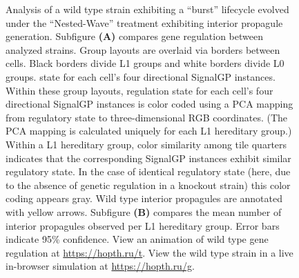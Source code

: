 \begin{figure}[!htbp]
\begin{center}
\caption{
Analysis of a wild type strain exhibiting a ``burst'' lifecycle evolved under the ``Nested-Wave'' treatment exhibiting interior propagule generation.
Subfigure \textbf{(A)} compares gene regulation between analyzed strains.
Group layouts are overlaid via borders between cells.
Black borders divide L1 groups and white borders divide L0 groups.
state for each cell's four directional SignalGP instances.
Within these group layouts, regulation state for each cell's four directional SignalGP instances is color coded using a PCA mapping from regulatory state to three-dimensional RGB coordinates.
(The PCA mapping is calculated uniquely for each L1 hereditary group.)
Within a L1 hereditary group, color similarity among tile quarters indicates that the corresponding SignalGP instances exhibit similar regulatory state.
In the case of identical regulatory state (here, due to the absence of genetic regulation in a knockout strain) this color coding appears gray.
Wild type interior propagules are annotated with yellow arrows.
Subfigure \textbf{(B)} compares the mean number of interior propagules observed per L1 hereditary group.
Error bars indicate 95\% confidence.
View an animation of wild type gene regulation at \url{https://hopth.ru/t}.
View the wild type strain in a live in-browser simulation at \url{https://hopth.ru/g}.
}
\label{fig:ko-interior_propagule}
\end{center}
\end{figure}
